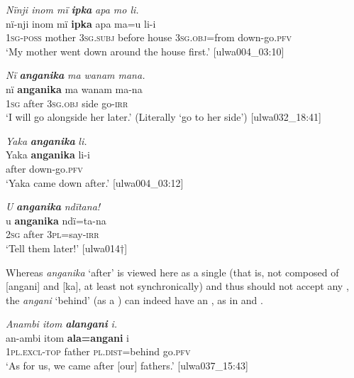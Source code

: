 \ea%
    \label{ex:otherwc:61}
          \textit{Nïnji inom mï} \textbf{\textit{ipka}} \textit{apa mo li.}\\
\gll    nï-nji    inom  mï      \textbf{ipka}  apa    ma=u li-i\\
    1\textsc{sg-poss}  mother  \textsc{3sg.subj}  before  house  3\textsc{sg.obj}=from    down-go.\textsc{pfv}\\
\glt `My mother went down around the house first.’ [ulwa004\_03:10]
\z

\ea%
    \label{ex:otherwc:62}
          \textit{Nï} \textbf{\textit{anganika}} \textit{ma wanam mana.}\\
\gll    nï    \textbf{anganika}  ma      wanam  ma-na\\
    1\textsc{sg}  after    3\textsc{sg.obj}  side  go-\textsc{irr}\\
\glt `I will go alongside her later.’ (Literally ‘go to her side’) [ulwa032\_18:41]
\z

\ea%
    \label{ex:otherwc:63}
          \textit{Yaka} \textbf{\textit{anganika}} \textit{li.}\\
\gll    Yaka  \textbf{anganika}  li-i\\
    [name]  after    down-go.\textsc{pfv}\\
\glt `Yaka came down after.’ [ulwa004\_03:12]
\z

\ea%
    \label{ex:otherwc:64}
          \textit{U} \textbf{\textit{anganika}} \textit{ndïtana!}\\
\gll    u    \textbf{anganika}  ndï=ta-na\\
    2\textsc{sg}  after    3\textsc{pl}=say-\textsc{irr}\\
\glt `Tell them later!’ [ulwa014†]
\z

Whereas \textit{anganika} ‘after’ is viewed here as a single  (that is, not composed of [angani] and [ka], at least not synchronically) and thus should not accept any  , the  \textit{angani} ‘behind’ (as a ) can indeed have an  , as in  and .

\ea%
    \label{ex:otherwc:65}
          \textit{Anambi itom} \textbf{\textit{alangani}} \textit{i.}\\
\gll    an-ambi    itom  \textbf{ala=angani}    i\\
    1\textsc{pl.excl-top}  father  \textsc{pl.dist}=behind  go.\textsc{pfv}\\
\glt `As for us, we came after [our] fathers.’ [ulwa037\_15:43]
\z

